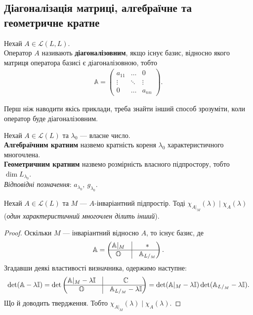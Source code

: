 \documentclass{math_library}
\begin{document}
\subsection{Діагоналізація матриці, алгебраїчне та геометричне кратне}
\begin{definition}
Нехай $A \in \mathcal{L}(L,L)$. \\
Оператор $A$ називають \textbf{діагоналізовним}, якщо існує базис, відносно якого матриця оператора базисі є діагоналізовною, тобто
\begin{align*}
\mathbb{A} = \begin{pmatrix}
a_{11} & \dots & 0 \\
\vdots & \ddots & \vdots \\
0 & \dots & a_{nn}
\end{pmatrix}.
\end{align*}
\end{definition}

Перш ніж наводити якісь приклади, треба знайти інший способ зрозуміти, коли оператор буде діагоналізовним.

\begin{definition}
Нехай $A \in \mathcal{L}(L)$ та $\lambda_0$ --- власне число.\\
\textbf{Алгебраїчним кратним} назвемо кратність кореня $\lambda_0$ характеристичного многочлена.\\
\textbf{Геометричним кратним} назвемо розмірність власного підпростору, тобто $\dim L_{\lambda_0}$.\\
\textit{Відповідні позначення}: $a_{\lambda_0},\ g_{\lambda_0}$.
\end{definition}

\begin{lemma}
Нехай $A \in \mathcal{L}(L)$ та $M$ --- $A$-інваріантний підпростір. Тоді $\chi_{A|_M}(\lambda) \mid \chi_A(\lambda)$ (\textit{один характеристичний многочлен ділить інший}).
\end{lemma}

\begin{proof}
Оскільки $M$ --- інваріантний відносно $A$, то існує базис, де
\[
\mathbb{A} = \begin{pmatrix}
\mathbb{A}|_{M} & \vline & * \\
\hline
\mathbb{O} & \vline & \mathbb{A}_{L/_M}
\end{pmatrix}.
\]
Згадавши деякі властивості визначника, одержимо наступне:
\[
\det (\mathbb{A} - \lambda \mathbb{I}) = \det \begin{pmatrix}
\mathbb{A}|_{M}- \lambda \mathbb{I} & \vline & \mathbb{C} \\
\hline
\mathbb{O} & \vline & \mathbb{A}_{L/_M}- \lambda \mathbb{I}
\end{pmatrix} = \det(\mathbb{A}|_M-\lambda \mathbb{I}) \det (\mathbb{A}_{L/_M} - \lambda \mathbb{I}).
\]
Що й доводить твердження. Тобто $\chi_{A|_M}(\lambda) \mid \chi_A(\lambda)$.
\end{proof}
\end{document}
